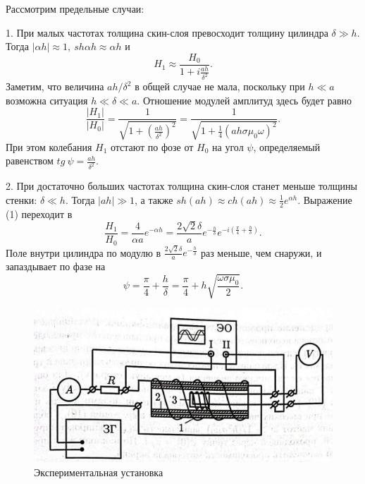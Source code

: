 \documentclass[a4paper,12pt]{article}
\begin{document}
Рассмотрим предельные случаи:\par
1. При малых частотах толщина скин-слоя превосходит толщину цилиндра $\delta \gg h$. Тогда $|\alpha h| \approx 1,~ sh \alpha h \approx \alpha h$ и 
\begin{equation}
    H_1 \approx \frac{H_0}{1 + i\frac{ah}{\delta^2}}.
\end{equation}
Заметим, что величина $ah/\delta^2$ в общей случае не мала, поскольку при $h\ll a$ возможна ситуация $h\ll \delta \ll a$. Отношение модулей амплитуд здесь будет равно
\begin{equation}
    \frac{|H_1|}{|H_0|} = \frac{1}{\sqrt{1 + (\frac{ah}{\delta^2})^2}}=\frac{1}{\sqrt{1 + \frac{1}{4}(ah\sigma \mu_0 \omega)^2}}.
\end{equation}
При этом колебания $H_1$ отстают по фозе от $H_0$ на угол $\psi$, определяемый равенством $tg~ \psi = \frac{ah}{\delta^2}$.\par
2. При достаточно больших частотах толщина скин-слоя станет меньше толщины стенки: $\delta \ll h$. Тогда $|ah|\gg 1$, а также $sh (ah)\approx ch(ah)\approx \frac{1}{2}e^{\alpha h}$. Выражение (1) переходит в 
\begin{equation}
    \frac{H_1}{H_0}=\frac{4}{\alpha a}e^{-\alpha h}=\frac{2\sqrt{2} \delta}{a}e^{-\frac{h}{\delta}}e^{-i(\frac{\pi}{4}+\frac{h}{\delta})}.
\end{equation}
Поле внутри цилиндра по модулю в $\frac{2\sqrt{2} \delta}{a}e^{-\frac{h}{\delta}}$ раз меньше, чем снаружи, и запаздывает по фазе на
\begin{equation}
    \psi = \frac{\pi}{4} + \frac{h}{\delta}=\frac{\pi}{4}+h\sqrt{\frac{\omega \sigma \mu_0}{2}}.
\end{equation}\newpage

\begin{figure}[!h]
\centering
\includegraphics[width=0.9\linewidth]{установка.jpg}
\caption{Экспериментальная установка}
\label{fig:mpr}
\end{figure}
\end{document}
